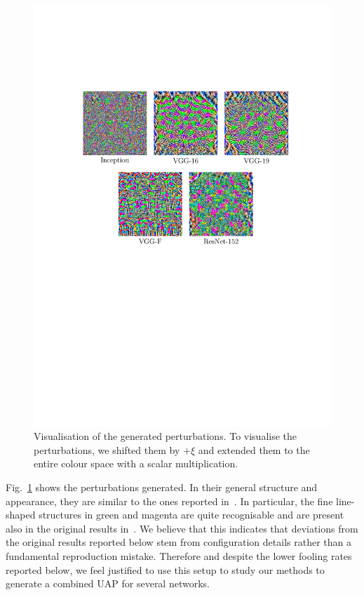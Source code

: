 \documentclass[runningheads]{llncs}
\begin{document}
\begin{figure}[ht]
	\centering
	\includegraphics[clip, trim=3.8cm 12.8cm 2.8cm 5.8cm, width=1.0\textwidth]{plots_generierung/perturbationsFigure.pdf}
	\caption{Visualisation of the generated perturbations. To visualise the perturbations, we shifted them by $+\xi$ and extended them to the entire colour space with a scalar multiplication.}\label{fig_stoerwerte}
\end{figure}

Fig.~\ref{fig_stoerwerte} shows the perturbations generated. In their general structure and appearance, they are similar to the ones reported in~\cite{moosavidezfooli_universal_2017}. In particular, the fine line-shaped structures in green and magenta are quite recognisable and are present also in the original results in~\cite{moosavidezfooli_universal_2017}. We believe that this indicates that deviations from the original results reported below stem from configuration details rather than a fundamental reproduction mistake. Therefore and despite the lower fooling rates reported below, we feel justified to use this setup to study our methods to generate a combined UAP for several networks. 
\end{document}
